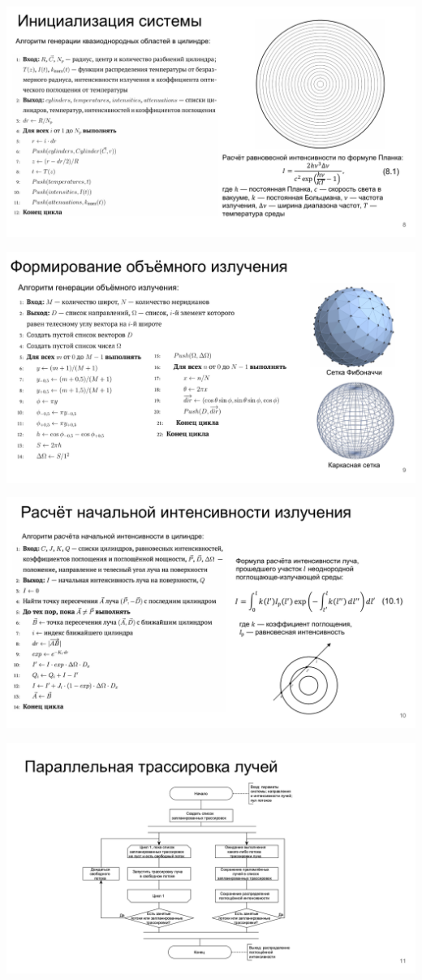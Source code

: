 \includegraphics[angle=90,origin=c]{inc/img/presentation-8}

\includegraphics[angle=90,origin=c]{inc/img/presentation-9}

\includegraphics[angle=90,origin=c]{inc/img/presentation-10}

\includegraphics[angle=90,origin=c]{inc/img/presentation-11}

